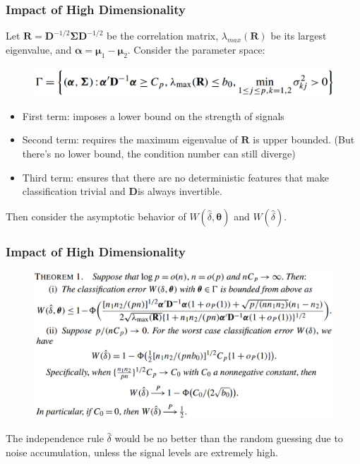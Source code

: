 \documentclass{beamer}
\begin{document}
	\begin{frame}
		\frametitle{Impact of High Dimensionality}
		Let $\bm{R} = \bm{D}^{-1/2}\bm{\Sigma}\bm{D}^{-1/2}$ be the correlation matrix, $\lambda_{max}(\bm{R})$ be its largest eigenvalue, and $\bm{\alpha} = \bm{\mu}_1 - \bm{\mu}_2$. Consider the parameter space:
		\begin{figure}
			\includegraphics[width=0.8\linewidth]{image002.png}
		\end{figure}
		\begin{itemize}
			\item
			First term: imposes a lower bound on the strength of signals
			\item
			Second term: requires the maximum eigenvalue of $\bm{R}$ is upper bounded. (But there's no lower bound, the condition number can still diverge)\item
			Third term: ensures that there are no deterministic features that make classification trivial and $\bm{D}$is always invertible. 	
		\end{itemize}
		Then consider the asymptotic behavior of $W(\hat{\delta}, \bm{\theta})$ and $W(\hat{\delta})$.
	\end{frame}

	\begin{frame}
		\frametitle{Impact of High Dimensionality}
		\begin{figure}
			\includegraphics[width=0.9\linewidth]{image003.png}
		\end{figure}
	The independence rule $\hat{\delta}$ would be no better than the random guessing due to noise accumulation, unless the signal levels are extremely high.
	\end{frame}
\end{document}
